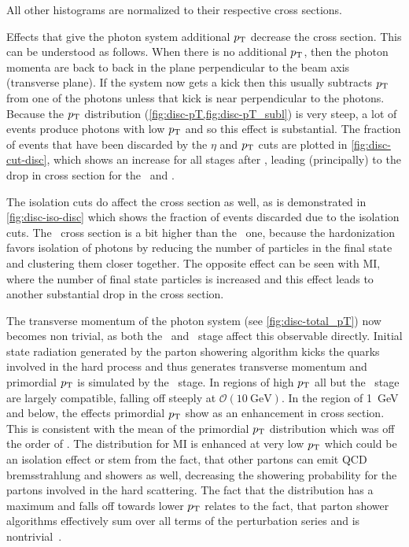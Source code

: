 All other histograms
are normalized to their respective cross sections.

Effects that give the photon system additional $p_\mathrm{T}$ decrease the
cross section. This can be understood as follows. When there is no
additional \(p_\mathrm{T}\), then the photon momenta are back to back in the
plane perpendicular to the beam axis (transverse plane). If the system
now gets a kick then this usually subtracts \(p_\mathrm{T}\) from one of the
photons unless that kick is near perpendicular to the photons. Because
the \(p_\mathrm{T}\) distribution (\cref{fig:disc-pT,fig:disc-pT_subl}) is very
steep, a lot of events produce photons with low \(p_\mathrm{T}\) and so this
effect is substantial. The fraction of events that have been discarded
by the \(\eta\) and \(p_\mathrm{T}\) cuts are plotted in
\cref{fig:disc-cut-disc}, which shows an increase for all stages after
\stone, leading (principally) to the drop in cross section for the
\sttwo\ and \stthree.

The isolation cuts do affect the cross section as well, as is
demonstrated in \cref{fig:disc-iso-disc} which shows the fraction of
events discarded due to the isolation cuts. The \stfour\ cross section
is a bit higher than the \stthree\ one, because the hardonization
favors isolation of photons by reducing the number of particles in the
final state and clustering them closer together. The opposite effect
can be seen with MI, where the number of final state particles is
increased and this effect leads to another substantial drop in the
cross section.

The transverse momentum of the photon system (see
\cref{fig:disc-total_pT}) now becomes non trivial, as both the \sttwo\
and \stthree\ stage affect this observable directly. Initial state
radiation generated by the parton showering algorithm kicks the quarks
involved in the hard process and thus generates transverse momentum
and primordial \(p_\mathrm{T}\) is simulated by the \stthree\ stage. In regions
of high \(p_\mathrm{T}\) all but the \stone\ stage are largely compatible,
falling off steeply at
\(\mathcal{O}(\SI{10}{\giga\electronvolt})\). In the region of
\SI{1}{\giga\electronvolt} and below, the effects primordial \(p_\mathrm{T}\)
show as an enhancement in cross section. This is consistent with the
mean of the primordial \(p_\mathrm{T}\) distribution which was off the order of
\gev{1}. The distribution for MI is enhanced at very low \(p_\mathrm{T}\) which
could be an isolation effect or stem from the fact, that other partons
can emit QCD bremsstrahlung and showers as well, decreasing the
showering probability for the partons involved in the hard scattering.
The fact that the distribution has a maximum and falls off towards
lower \(p_\mathrm{T}\) relates to the fact, that parton shower algorithms
effectively sum over all terms of the perturbation series and is
nontrivial~\cite{buckley:2011ge}.

